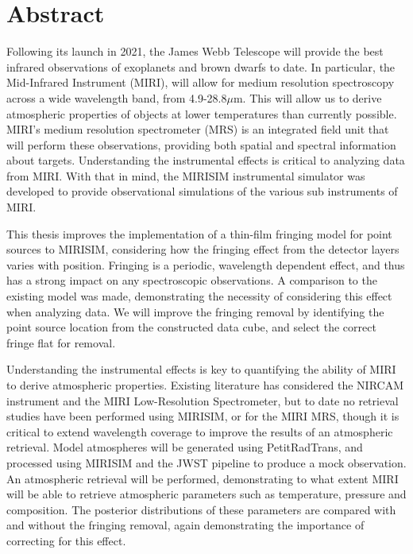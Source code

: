 
\chapter*{Abstract}
Following its launch in 2021, the James Webb Telescope will provide the best infrared observations of exoplanets and brown dwarfs to date.
In particular, the Mid-Infrared Instrument (MIRI), will allow for medium resolution spectroscopy across a wide wavelength band, from 4.9-28.8$\mu$m.
This will allow us to derive atmospheric properties of objects at lower temperatures than currently possible. 
MIRI's medium resolution spectrometer (MRS) is an integrated field unit that will perform these observations, providing both spatial and spectral information about targets.
Understanding the instrumental effects is critical to analyzing data from MIRI.
With that in mind, the MIRISIM instrumental simulator was developed to provide observational simulations of the various sub instruments of MIRI.

This thesis improves the implementation of a thin-film fringing model for point sources to MIRISIM, considering how the fringing effect from the detector layers varies with position. 
Fringing is a periodic, wavelength dependent effect, and thus has a strong impact on any spectroscopic observations.
A comparison to the existing model was made, demonstrating the necessity of considering this effect when analyzing data. 
We will improve the fringing removal by identifying the point source location from the constructed data cube, and select the correct fringe flat for removal.

Understanding the instrumental effects is key to quantifying the ability of MIRI to derive atmospheric properties.
Existing literature has considered the NIRCAM instrument and the MIRI Low-Resolution Spectrometer, but to date no retrieval studies have been performed using MIRISIM, or for the MIRI MRS, though it is critical to extend wavelength coverage to improve the results of an atmospheric retrieval.
Model atmospheres will be generated using PetitRadTrans, and processed using MIRISIM and the JWST pipeline to produce a mock observation.
An atmospheric retrieval will be performed, demonstrating to what extent MIRI will be able to retrieve atmospheric parameters such as temperature, pressure and composition. The posterior distributions of these parameters are compared with and without the fringing removal, again demonstrating the importance of correcting for this effect.
